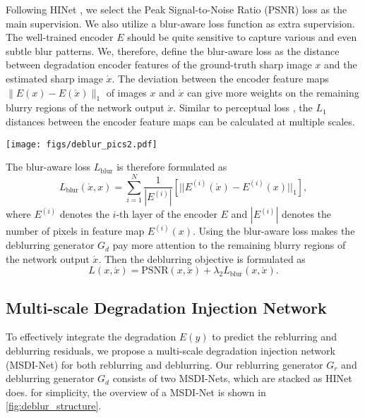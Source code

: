 \documentclass[runningheads]{llncs}
\begin{document}
Following HINet \cite{HINet}, we select the Peak Signal-to-Noise Ratio (PSNR) loss as the main supervision. We also utilize a blur-aware loss function as extra supervision. The well-trained encoder $E$ should be quite sensitive to capture various and even subtle blur patterns. We, therefore, define the blur-aware loss as the distance between degradation encoder features of the ground-truth sharp image $x$ and the estimated sharp image $\acute{x}$. 
The deviation between the encoder feature maps $\|E(x)- E(\acute{x})\|_1$ of images $x$ and $\acute{x}$ can give more weights on the remaining blurry regions of the network output $\acute{x}$. Similar to perceptual loss \cite{Johnson2016Perceptual}, the $L_1$ distances between the encoder feature maps can be calculated at multiple scales.
\begin{figure*}[t]
  \centering
   \texttt{[image: figs/deblur\_pics2.pdf]}
   \caption{The network structure of multi-scale degradation injection network for image deblurring. Image reblurring shares the same structure.}
   \label{fig:deblur_structure}
\end{figure*}
The blur-aware loss $L_{\mathrm{blur}}$ is therefore formulated as
\begin{equation}
    \label{eq:blur-aware}
    L_{\mathrm{blur}}(\acute{x},x) = \sum_{i=1}^N \frac{1}{|E^{(i)}|} [||E^{(i)}(\acute{x}) - E^{(i)}(x)||_1],
\end{equation}
where $E^{(i)}$ denotes the $i$-th layer of the encoder $E$ and $|E^{(i)}|$ denotes the number of pixels in feature map $E^{(i)}(x)$. Using the blur-aware loss makes the deblurring generator $G_d$ pay more attention to the remaining blurry regions of the network output $\acute{x}$.
Then the deblurring objective is formulated as
\begin{equation}
    \label{eq:deblurring_loss}
    L(x,\acute{x})= \mathrm{PSNR}(x,\acute{x}) + \lambda_2 L_{\mathrm{blur}}(x,\acute{x}).
\end{equation}




\subsection{Multi-scale Degradation Injection Network}

To effectively integrate the degradation $E(y)$ to predict the reblurring and deblurring residuals, we propose a multi-scale degradation injection network (MSDI-Net) for both reblurring and deblurring.  Our reblurring generator $G_r$ and deblurring generator $G_d$ consists of two MSDI-Nets, which are stacked as HINet \cite{HINet} does. for simplicity, the overview of a MSDI-Net is shown in \cref{fig:deblur_structure}. 
\end{document}
